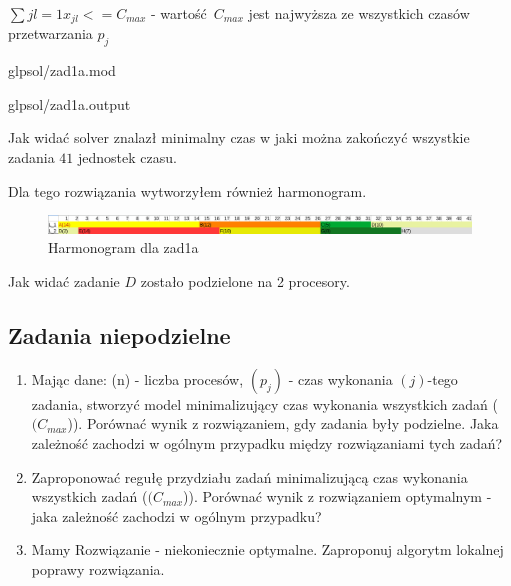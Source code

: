 \documentclass{article}
\begin{document}
$\sum{j}{l = 1} x_{jl} <= C_{max}$ - wartość $C_{max}$ jest najwyższa ze wszystkich czasów przetwarzania $p_j$


{glpsol/zad1a.mod}


{glpsol/zad1a.output}

Jak widać solver znalazł minimalny czas w jaki można zakończyć wszystkie zadania $41$ jednostek czasu.

Dla tego rozwiązania wytworzyłem również harmonogram.

\begin{figure}[h]    
  \centering    
  \includegraphics[width=\linewidth]{others/zad1a_harmonogram.png}
  \caption{Harmonogram dla zad1a}
\end{figure}

Jak widać zadanie $D$ zostało podzielone na 2 procesory.

\subsection{Zadania niepodzielne}

\begin{enumerate}[label=(\alph*)]
    \item Mając dane: (n) - liczba procesów, $(p_j)$ - czas wykonania
          $(j)$-tego zadania, stworzyć model minimalizujący czas wykonania
          wszystkich zadań ($(C_{max}$)). Porównać wynik z rozwiązaniem,
          gdy zadania były podzielne.
          Jaka zależność zachodzi w ogólnym przypadku między rozwiązaniami tych zadań?
    \item Zaproponować regułę przydziału zadań minimalizującą czas
          wykonania wszystkich zadań ($(C_{max}$)).
          Porównać wynik z rozwiązaniem optymalnym - jaka zależność zachodzi w ogólnym przypadku?
    \item Mamy Rozwiązanie - niekoniecznie optymalne. Zaproponuj algorytm lokalnej poprawy rozwiązania.
\end{enumerate}
\end{document}
